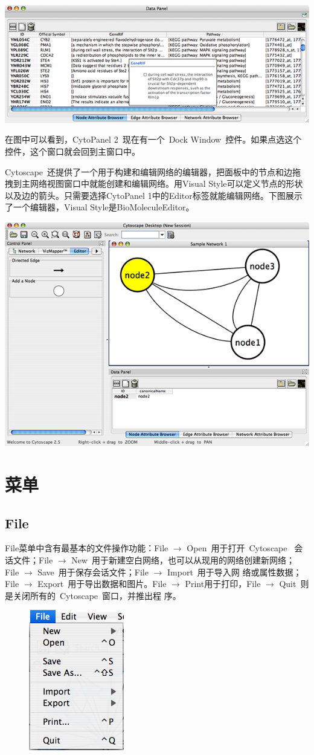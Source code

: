 {\centering
\includegraphics[width=.6\textwidth]{images/attribute_browser_26.png}
}

在图中可以看到，CytoPanel 2~现在有一个~Dock Window~控件。如果点选这个控件，这个窗口就会回到主窗口中。

Cytoscape~还提供了一个用于构建和编辑网络的编辑器，把面板中的节点和边拖拽到主网络视图窗口中就能创建和编辑网络。用Visual Style可以定义节点的形状以及边的箭头。只需要选择CytoPanel 1中的Editor标签就能编辑网络。下图展示了一个编辑器，Visual Style是BioMoleculeEditor。

{\centering
\includegraphics[width=.6\textwidth]{images/editor_25.png}}

\section{菜单}
	\subsection{File}
	File菜单中含有最基本的文件操作功能：File $\rightarrow$ Open~用于打开~Cytoscape~
	会话文件；File $\rightarrow$ New~用于新建空白网络，也可以从现用的网络创建新网络；
	File $\rightarrow$ Save~用于保存会话文件；File $\rightarrow$ Import~用于导入网
	络或属性数据；File $\rightarrow$ Export~用于导出数据和图片。File $\rightarrow$ 
	Print用于打印，File $\rightarrow$ Quit~则是关闭所有的~Cytoscape~窗口，并推出程
	序。

	\begin{figure}[!h]
	\centerline{\includegraphics[scale=0.6]{images/menu_file_26.png} }
	\end{figure}

